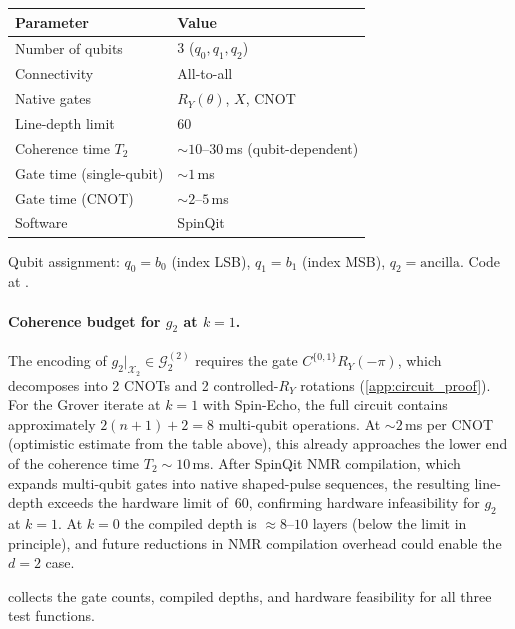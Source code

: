 \documentclass[12pt,a4paper]{article}
\theoremstyle{plain}
\theoremstyle{definition}
\theoremstyle{remark}
\newcommand{\Ry}{R_Y}
\newcommand{\Gclass}[2]{\mathcal{G}_{#1}^{(#2)}}
\begin{document}
\begin{center}
\renewcommand{\arraystretch}{1.3}
\begin{tabular}{ll}
\toprule
Parameter & Value \\
\midrule
Number of qubits & 3 ($q_0, q_1, q_2$) \\
Connectivity & All-to-all \\
Native gates & $\Ry(\theta)$, $X$, CNOT \\
Line-depth limit & 60 \\
Coherence time $T_2$ & $\sim10$--$30$\,ms (qubit-dependent) \\
Gate time (single-qubit) & $\sim1$\,ms \\
Gate time (CNOT) & $\sim2$--$5$\,ms \\
Software & SpinQit \cite{SpinQit2022} \\
\bottomrule
\end{tabular}
\end{center}

Qubit assignment: $q_0=b_0$ (index LSB), $q_1=b_1$ (index MSB),
$q_2=\text{ancilla}$.
Code at \cite{spinqit_repo}.

\paragraph{Coherence budget for $g_2$ at $k=1$.}
The encoding of $g_2|_{\mathcal{X}_2}\in\Gclass{2}{2}$ requires the gate
$C^{\{0,1\}}R_Y(-\pi)$, which decomposes into 2 CNOTs and
2 controlled-$R_Y$ rotations (\cref{app:circuit_proof}).
For the Grover iterate at $k=1$ with Spin-Echo, the full circuit
contains approximately $2(n+1)+2=8$ multi-qubit operations.
At $\sim2$\,ms per CNOT (optimistic estimate from the table above),
this already approaches the lower end of the coherence time
$T_2\sim10$\,ms.
After SpinQit NMR compilation, which expands multi-qubit gates into
native shaped-pulse sequences, the resulting line-depth exceeds the
hardware limit of~60, confirming hardware infeasibility for $g_2$
at $k=1$.
At $k=0$ the compiled depth is $\approx8$--$10$ layers
(below the limit in principle), and future reductions in
NMR compilation overhead could enable the $d=2$ case.

 collects the gate counts, compiled depths,
and hardware feasibility for all three test functions.
\end{document}
